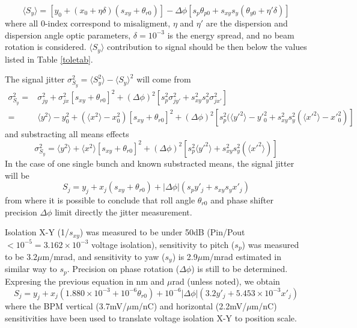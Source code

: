 \begin{equation}
 \langle S_y\rangle = [y_0+(x_0+\eta\delta)(s_{xy}+\theta_{r0})]-\Delta\phi[s_p\theta_{p0}+s_{xy}s_y(\theta_{y0}+\eta'\delta)]
\end{equation}
where all 0-index correspond to misaligment, $\eta$ and $\eta'$ are the dispersion and dispersion angle optic parameters, $\delta=10^{-3}$ is the energy spread, and no beam rotation is considered. $\langle S_y\rangle$ contribution to signal should be then below the values listed in Table \ref{toletab}.\par
The signal jitter $\sigma_{S_y}^2=\langle S_y^2\rangle-\langle S_y\rangle^2$ will come from
\begin{align*}
 \sigma_{S_y}^2=&\sigma_{jy}^2+\sigma_{jx}^2[s_{xy}+\theta_{r0}]^2+(\Delta\phi)^2[s_p^2\sigma_{jy'}^2+s_{xy}^2s_y^2\sigma_{jx'}^2]\\
 =&\langle y^2\rangle-y_0^2+(\langle x^2\rangle-x_0^2)[s_{xy}+\theta_{r0}]^2+(\Delta\phi)^2[s_p^2(\langle y'^2\rangle-y'^2_0 +s_{xy}^2s_y^2(\langle x'^2\rangle-x'^2_0)]
\end{align*}
and substracting all means effects
\begin{equation}
 \sigma_{S_y}^2=\langle y^2\rangle+\langle x^2\rangle[s_{xy}+\theta_{r0}]^2+(\Delta\phi)^2[s_p^2\langle y'^2\rangle+s_{xy}^2s_y^2(\langle x'^2\rangle)]
\end{equation}
In the case of one single bunch and known substracted means, the signal jitter will be
\begin{equation}
 S_j=y_j+x_j(s_{xy}+\theta_{r0})+|\Delta\phi|(s_py'_j+s_{xy}s_yx'_j)
\end{equation}
from where it is possible to conclude that roll angle $\theta_{r0}$ and phase shifter precision $\Delta\phi$ limit directly the jitter measurement.\par
Isolation X-Y (1/$s_{xy}$) was measured to be under 50dB (Pin/Pout$<10^{-5}=3.162\times10^{-3}$ voltage isolation), sensitivity to pitch ($s_p$) was measured to be $3.2\mu$m/mrad, and sensitivity to yaw ($s_y$) is 2.9$\mu$m/mrad estimated in similar way to $s_p$. Precision on phase rotation ($\Delta\phi$) is still to be determined. Expresing the previous equation in nm and $\mu$rad (unless noted), we obtain
\begin{equation}
 S_j=y_j+x_j(1.880\times10^{-3}+10^{-6}\theta_{r0})+10^{-6}|\Delta\phi|(3.2y'_j+5.453\times10^{-3}x'_j)
\end{equation}
where  the BPM vertical (3.7mV/$\mu$m/nC) and horizontal (2.2mV/$\mu$m/nC) sensitivities have been used to translate voltage isolation X-Y to position scale.

